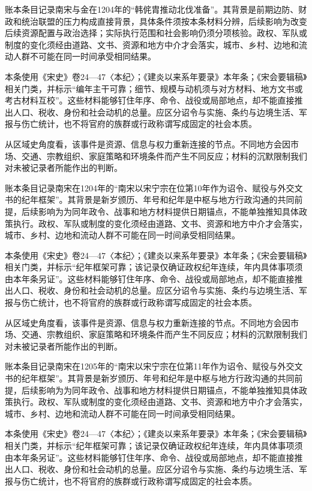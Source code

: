 账本条目记录南宋与金在1204年的“韩侂胄推动北伐准备”。其背景是前期边防、财政和统治联盟的压力构成直接背景，具体条件须按本条材料分辨，后续影响为改变后续资源配置与政治选择；实际执行范围和社会影响仍须分项核验。政权、军队或制度的变化须经由道路、文书、资源和地方中介才会落实，城市、乡村、边地和流动人群不可能在同一时间承受相同结果。

本条使用《宋史》卷24—47〈本纪〉；《建炎以来系年要录》本年条；《宋会要辑稿》相关门类，并标示“编年主干可靠；细节、规模与动机须与对方材料、地方文书或考古材料互校”。这些材料能够钉住年序、命令、战役或局部地点，却不能直接推出人口、税收、身份和社会动机的总量。应区分诏令与实施、条约与边境生活、军报与伤亡统计，也不将官府的族群或行政称谓写成固定的社会本质。

从区域史角度看，该事件是资源、信息与权力重新连接的节点。不同地方会因市场、交通、宗教组织、家庭策略和环境条件而产生不同反应；材料的沉默限制我们对未被记录者所能作出的判断。

账本条目记录南宋在1204年的“南宋以宋宁宗在位第10年作为诏令、赋役与外交文书的纪年框架”。其背景是新岁颁历、年号和纪年是中枢与地方行政沟通的共同前提，后续影响为为同年政令、战事和地方材料提供日期锚点，不能单独推知具体政策执行。政权、军队或制度的变化须经由道路、文书、资源和地方中介才会落实，城市、乡村、边地和流动人群不可能在同一时间承受相同结果。

本条使用《宋史》卷24—47〈本纪〉；《建炎以来系年要录》本年条；《宋会要辑稿》相关门类，并标示“纪年框架可靠；该记录仅确证政权纪年连续，年内具体事项须由本年条另证”。这些材料能够钉住年序、命令、战役或局部地点，却不能直接推出人口、税收、身份和社会动机的总量。应区分诏令与实施、条约与边境生活、军报与伤亡统计，也不将官府的族群或行政称谓写成固定的社会本质。

从区域史角度看，该事件是资源、信息与权力重新连接的节点。不同地方会因市场、交通、宗教组织、家庭策略和环境条件而产生不同反应；材料的沉默限制我们对未被记录者所能作出的判断。

账本条目记录南宋在1205年的“南宋以宋宁宗在位第11年作为诏令、赋役与外交文书的纪年框架”。其背景是新岁颁历、年号和纪年是中枢与地方行政沟通的共同前提，后续影响为为同年政令、战事和地方材料提供日期锚点，不能单独推知具体政策执行。政权、军队或制度的变化须经由道路、文书、资源和地方中介才会落实，城市、乡村、边地和流动人群不可能在同一时间承受相同结果。

本条使用《宋史》卷24—47〈本纪〉；《建炎以来系年要录》本年条；《宋会要辑稿》相关门类，并标示“纪年框架可靠；该记录仅确证政权纪年连续，年内具体事项须由本年条另证”。这些材料能够钉住年序、命令、战役或局部地点，却不能直接推出人口、税收、身份和社会动机的总量。应区分诏令与实施、条约与边境生活、军报与伤亡统计，也不将官府的族群或行政称谓写成固定的社会本质。

